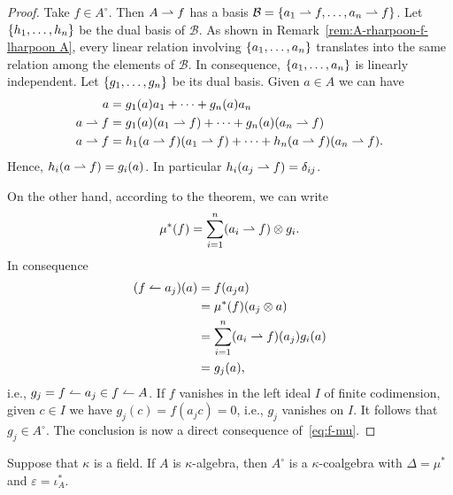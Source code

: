 \begin{proof}
    Take $f\in A^\circ$. Then $A\rightharpoonup f$ has a basis $\mathcal B=\{a_1\rightharpoonup f,\dots,a_n\rightharpoonup f\}$. Let $\{h_1,\dots,h_n\}$ be the dual basis of $\mathcal B$. As shown in Remark~\ref{rem:A-rharpoon-f-lharpoon A}, every linear relation involving $\{a_1,\dots,a_n\}$ translates into the same relation among the elements of $\mathcal B$. In consequence, $\{a_1,\dots,a_n\}$ is linearly independent. Let $\{g_1,\dots,g_n\}$ be its dual basis. Given $a\in A$ we can have
    \begin{align*}
        a &= g_1(a)a_1+\cdots+g_n(a)a_n\\
        a\rightharpoonup f &= g_1(a)(a_1\rightharpoonup f)
                +\cdots+g_n(a)(a_n\rightharpoonup f)\\
        a\rightharpoonup f &= h_1(a\rightharpoonup f)(a_1\rightharpoonup f)
                +\cdots+h_n(a\rightharpoonup f)(a_n\rightharpoonup f).
    \end{align*}
    Hence, $h_i(a\rightharpoonup f) = g_i(a)$. In particular $h_i(a_j\rightharpoonup f)=\delta_{ij}$.

    On the other hand, according to the theorem, we can write
    \begin{equation}\label{eq:f-mu}
        \mu^*(f) = \sum_{i=1}^n(a_i\rightharpoonup f)\otimes g_i.
    \end{equation}
    In consequence
    \begin{align*}
        (f\leftharpoonup a_j)(a) &= f(a_ja)\\
            &= \mu^*(f)(a_j\otimes a)\\
            &= \sum_{i=1}^n(a_i\rightharpoonup f)(a_j)g_i(a)\\
            &= g_j(a),
    \end{align*}
    i.e., $g_j=f\leftharpoonup a_j\in f\leftharpoonup A$. If $f$ vanishes in the left ideal $I$ of finite codimension, given $c\in I$ we have $g_j(c)=f(a_jc)=0$, i.e., $g_j$ vanishes on $I$. It follows that $g_j\in A^\circ$. The conclusion is now a direct consequence of~\eqref{eq:f-mu}.
\end{proof}

\begin{cor}\label{cor:algebra-to-coalgebra}
    Suppose that\/ $\kappa$ is a field. If\/ $A$ is\/ $\kappa$-algebra, then\/ $A^\circ$ is a\/ $\kappa$-coalgebra with\/ $\Delta=\mu^*$ and\/ $\varepsilon=\iota_A^*$.
\end{cor}

